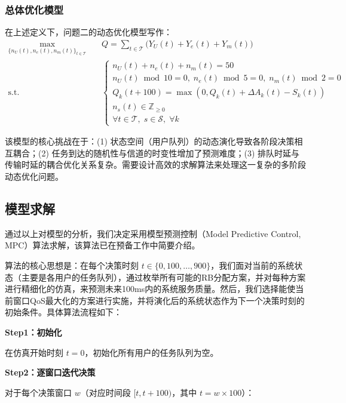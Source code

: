 \subsubsection{总体优化模型}
在上述定义下，问题二的动态优化模型写作：
\begin{equation}
\label{eq:q2_obj}
\begin{aligned}
\max_{\{n_U(t),n_e(t),n_m(t)\}_{t\in\mathcal{T}}}\quad & Q=\sum_{t\in\mathcal{T}}\Big( Y_U(t)+Y_e(t)+Y_m(t) \Big) \\
\text{s.t.} \quad & \begin{cases}
  n_U(t) + n_e(t) + n_m(t) = 50\\
  n_U(t) \bmod 10 = 0,\; n_e(t) \bmod 5 = 0,\; n_m(t) \bmod 2 = 0\\
  Q_k(t+100) = \max\!\left(0, Q_k(t) + \Delta A_k(t) - S_k(t)\right) \\
  n_s(t) \in \mathbb{Z}_{\ge 0}\\
  \forall t \in \mathcal{T},\;s \in \mathcal{S},\; \forall k
  \end{cases}
  \end{aligned}
\end{equation}

该模型的核心挑战在于：(1) 状态空间（用户队列）的动态演化导致各阶段决策相互耦合；(2) 任务到达的随机性与信道的时变性增加了预测难度；(3) 排队时延与传输时延的耦合优化关系复杂。需要设计高效的求解算法来处理这一复杂的多阶段动态优化问题。

\subsection{模型求解}

通过以上对模型的分析，我们决定采用模型预测控制（Model Predictive Control, MPC）算法求解，该算法已在预备工作中简要介绍。

算法的核心思想是：在每个决策时刻 $t \in \{0, 100, \dots, 900\}$，我们面对当前的系统状态（主要是各用户的任务队列），通过枚举所有可能的RB分配方案，并对每种方案进行精细化的仿真，来预测未来100ms内的系统服务质量。然后，我们选择能使当前窗口QoS最大化的方案进行实施，并将演化后的系统状态作为下一个决策时刻的初始条件。具体算法流程如下：

\textbf{Step1：初始化}

在仿真开始时刻 $t=0$，初始化所有用户的任务队列为空。

\textbf{Step2：逐窗口迭代决策}

对于每个决策窗口 $w$（对应时间段 $[t, t+100)$，其中 $t = w \times 100$）：

